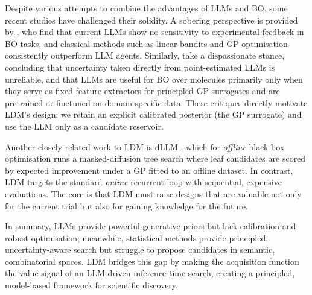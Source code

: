 Despite various attempts to combine the advantages of LLMs and BO, some recent studies have challenged their solidity. A sobering perspective is provided by \citet{guptaLLMsBayesianOptimization2025}, who find that current LLMs show no sensitivity to experimental feedback in BO tasks, and classical methods such as linear bandits and GP optimisation consistently outperform LLM agents. Similarly, \citet{kristiadiSoberLookLLMs2024} take a dispassionate stance, concluding that uncertainty taken directly from point-estimated LLMs is unreliable, and that LLMs are useful for BO over molecules primarily only when they serve as fixed feature extractors for principled GP surrogates and are pretrained or finetuned on domain-specific data. These critiques directly motivate LDM's design: we retain an explicit calibrated posterior (the GP surrogate) and use the LLM only as a candidate reservoir.

Another closely related work to LDM is dLLM \citep{yuan2026diffusion}, which for \emph{offline} black-box optimisation runs a masked-diffusion tree search where leaf candidates are scored by expected improvement under a GP fitted to an offline dataset. In contrast, LDM targets the standard \emph{online} recurrent loop with sequential, expensive evaluations. The core is that LDM must raise designs that are valuable not only for the current trial but also for gaining knowledge for the future.

In summary, LLMs provide powerful generative priors but lack calibration and robust optimisation; meanwhile, statistical methods provide principled, uncertainty-aware search but struggle to propose candidates in semantic, combinatorial spaces. LDM bridges this gap by making the acquisition function the value signal of an LLM-driven inference-time search, creating a principled, model-based framework for scientific discovery.
